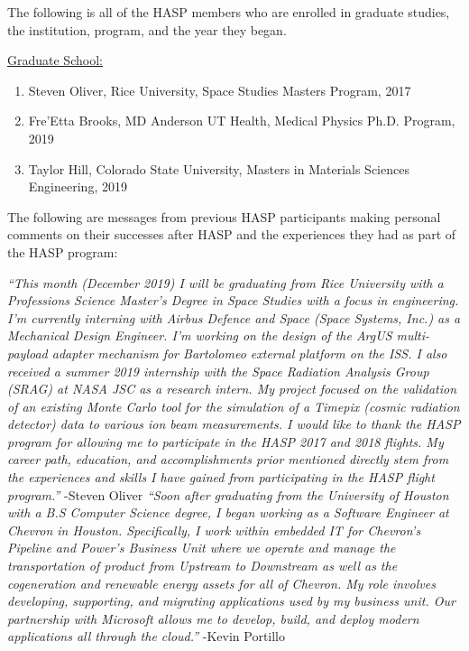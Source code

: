 \begin{appendices}
  \vspace{0.5cm}
  
  \noindent The following is all of the HASP members who are enrolled in graduate studies, the institution, program, and the year they began.
  
  \vspace{0.25cm}
  \noindent\underline{Graduate School:}
  \begin{enumerate}[leftmargin=3\parindent]
  \item Steven Oliver, Rice University, Space Studies Masters Program, 2017
  \item Fre'Etta Brooks, MD Anderson UT Health, Medical Physics Ph.D. Program, 2019
  \item Taylor Hill, Colorado State University, Masters in Materials Sciences Engineering, 2019
  \end{enumerate}

  \noindent The following are messages from previous HASP participants making personal comments on their successes after HASP and the experiences they had as part of the HASP program:

  \textit{``This month (December 2019) I will be graduating from Rice University with a Professions Science Master's Degree in Space Studies with a focus in engineering. I'm currently interning with Airbus Defence and Space (Space Systems, Inc.) as a Mechanical Design Engineer. I'm working on the design of the ArgUS multi-payload adapter mechanism for Bartolomeo external platform on the ISS. \newline
    I also received a summer 2019 internship with the Space Radiation Analysis Group (SRAG) at NASA JSC as a research intern. My project focused on the validation of an existing Monte Carlo tool for the simulation of a Timepix (cosmic radiation detector) data to various ion beam measurements. \newline
    I would like to thank the HASP program for allowing me to participate in the HASP 2017 and 2018 flights. My career path, education, and accomplishments prior mentioned directly stem from the experiences and skills I have gained from participating in the HASP flight program.''}
  \newline\hspace*{12cm} -Steven Oliver
  \vspace{2cm}
  \textit{``Soon after graduating from the University of Houston with a B.S Computer Science degree, I began working as a Software Engineer at Chevron in Houston. Specifically, I work within embedded IT for Chevron’s Pipeline and Power’s Business Unit where we operate and manage the transportation of product from Upstream to Downstream as well as the cogeneration and renewable energy assets for all of Chevron. My role involves developing, supporting, and migrating applications used by my business unit. Our partnership with Microsoft allows me to develop, build, and deploy modern applications all through the cloud.''}
  \newline\hspace*{12cm} -Kevin Portillo

  
\end{appendices}
